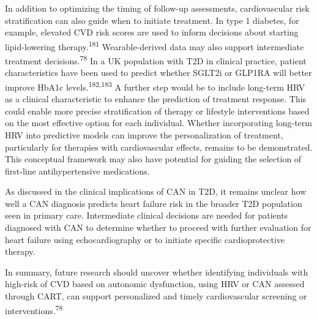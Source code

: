 \documentclass[
  a4paper,
  headsepline=true,
  open=left]{scrbook}
\begin{document}
In addition to optimizing the timing of follow-up assessments,
cardiovascular risk stratification can also guide when to initiate
treatment. In type 1 diabetes, for example, elevated CVD risk scores are
used to inform decisions about starting lipid-lowering
therapy.\textsuperscript{181} Wearable-derived data may also support
intermediate treatment decisions.\textsuperscript{78} In a UK population
with T2D in clinical practice, patient characteristics have been used to
predict whether SGLT2i or GLP1RA will better improve HbA1c
levels.\textsuperscript{182,183} A further step would be to include
long-term HRV as a clinical characteristic to enhance the prediction of
treatment response. This could enable more precise stratification of
therapy or lifestyle interventions based on the most effective option
for each individual. Whether incorporating long-term HRV into predictive
models can improve the personalization of treatment, particularly for
therapies with cardiovascular effects, remains to be demonstrated. This
conceptual framework may also have potential for guiding the selection
of first-line antihypertensive medications.

As discussed in the clinical implications of CAN in T2D, it remains
unclear how well a CAN diagnosis predicts heart failure risk in the
broader T2D population seen in primary care. Intermediate clinical
decisions are needed for patients diagnosed with CAN to determine
whether to proceed with further evaluation for heart failure using
echocardiography or to initiate specific cardioprotective therapy.

In summary, future research should uncover whether identifying
individuals with high-risk of CVD based on autonomic dysfunction, using
HRV or CAN assessed through CART, can support personalized and timely
cardiovascular screening or interventions.\textsuperscript{78}
\end{document}
